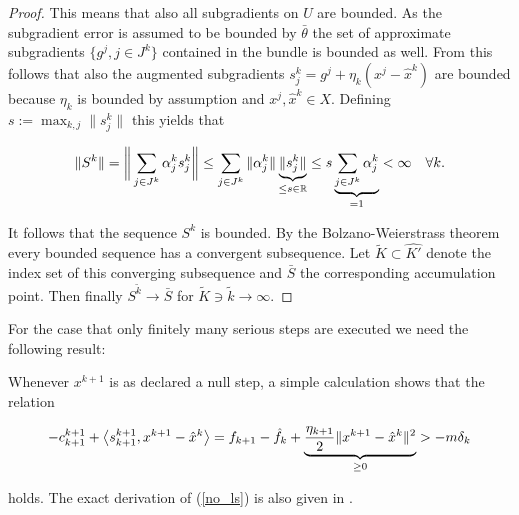 \begin{proof}
		This means that also all subgradients on \(U\) are bounded. As the subgradient error is assumed to be bounded by \(\bar{\theta}\) the set of approximate subgradients \(\{g^j, j \in J^k\}\) contained in the bundle is bounded as well.
		From this follows that also the augmented subgradients \(s_j^k = g^j+\eta_k(x^j-\hat{x}^k)\) are bounded because \(\eta_k\) is bounded by assumption and \(x^j, \hat{x}^k \in X\).		
Defining \(s:= \max_{k,j}\|s^k_j\|\) this yields that 
		
		\[\Vert S^k\Vert = \bigg\Vert\sum_{j \in J^k}{\alpha_j^k s_j^k}\bigg\Vert \leq  \sum_{j \in J^k}{\Vert\alpha_j^k\Vert\underbrace{\Vert s^k_j\Vert}_{\leq s \in \mathbb{R}}} \leq s\underbrace{\sum_{j \in J^k}{\alpha_j^k}}_{=1} < \infty \quad \forall k. \]
		
		It follows that the sequence \(S^k\) is bounded.
		By the Bolzano-Weierstrass theorem \cite[p. 51]{Koenigsberger2003} every bounded sequence has a convergent subsequence. Let \(\tilde{K} \subset \hat{K'}\) denote the index set of this converging subsequence and \(\bar{S}\) the corresponding accumulation point. Then finally \(S^{\tilde{k}} \to \bar{S}\) for \(\tilde{K} \ni {\tilde{k}}\to \infty\).
		
	
\end{proof}


For the case that only finitely many serious steps are executed we need the following result:


Whenever \(x^{k+1}\) is as declared a null step, a simple calculation shows that the relation 

\begin{equation}
	-c^{k+1}_{k+1} + \left\langle s^{k+1}_{k+1}, x^{k+1}-\hat{x}^k\right\rangle = f_{k+1}-\hat{f}_k + \underbrace{\frac{\eta_{k+1}}{2}\Vert x^{k+1}-\hat{x}^{k}\Vert^2}_{\geq 0}>-m\delta_k
\label{no_ls}
\end{equation}

holds.
The exact derivation of (\ref{no_ls}) is also given in \cite[p. 16]{Hare2016}.

